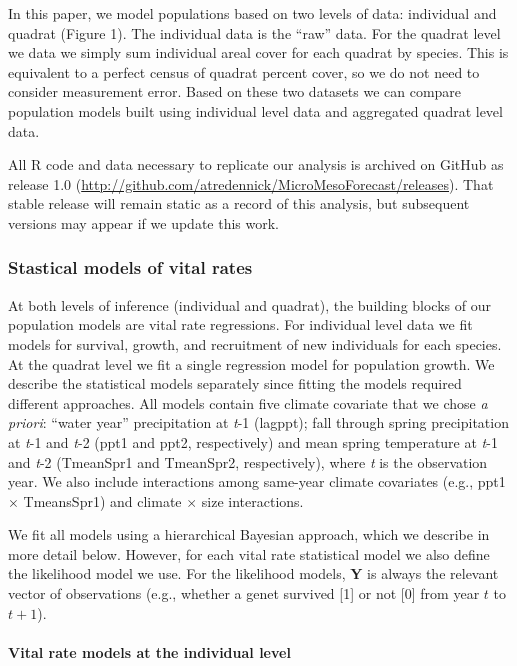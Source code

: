 \documentclass[12pt,]{article}
\begin{document}
In this paper, we model populations based on two levels of data:
individual and quadrat (Figure 1). The individual data is the ``raw''
data. For the quadrat level we data we simply sum individual areal cover
for each quadrat by species. This is equivalent to a perfect census of
quadrat percent cover, so we do not need to consider measurement error.
Based on these two datasets we can compare population models built using
individual level data and aggregated quadrat level data.

All R code and data necessary to replicate our analysis is archived on
GitHub as release 1.0
(\url{http://github.com/atredennick/MicroMesoForecast/releases}). That
stable release will remain static as a record of this analysis, but
subsequent versions may appear if we update this work.

\subsubsection{Stastical models of vital
rates}\label{stastical-models-of-vital-rates}

At both levels of inference (individual and quadrat), the building
blocks of our population models are vital rate regressions. For
individual level data we fit models for survival, growth, and
recruitment of new individuals for each species. At the quadrat level we
fit a single regression model for population growth. We describe the
statistical models separately since fitting the models required
different approaches. All models contain five climate covariate that we
chose \emph{a priori}: ``water year'' precipitation at \emph{t}-1
(lagppt); fall through spring precipitation at \emph{t}-1 and \emph{t}-2
(ppt1 and ppt2, respectively) and mean spring temperature at \emph{t}-1
and \emph{t}-2 (TmeanSpr1 and TmeanSpr2, respectively), where \emph{t}
is the observation year. We also include interactions among same-year
climate covariates (e.g., ppt1 \(\times\) TmeansSpr1) and climate
\(\times\) size interactions.

We fit all models using a hierarchical Bayesian approach, which we
describe in more detail below. However, for each vital rate statistical
model we also define the likelihood model we use. For the likelihood
models, \textbf{Y} is always the relevant vector of observations (e.g.,
whether a genet survived {[}1{]} or not {[}0{]} from year \(t\) to
\(t+1\)).

\paragraph{Vital rate models at the individual
level}\label{vital-rate-models-at-the-individual-level}
\end{document}
